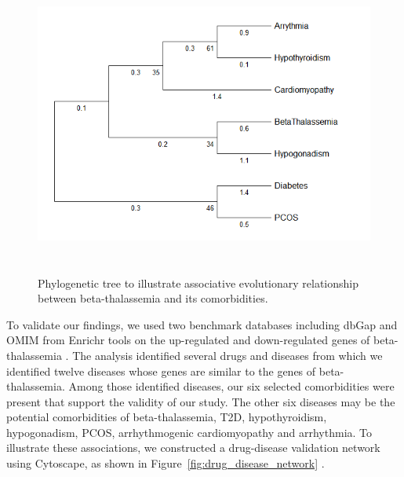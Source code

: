 \begin{figure}[H]
    \centering
    \includegraphics[height=10cm]{./fig/fig4_15.png}
    \centering
    \caption{Phylogenetic tree to illustrate associative evolutionary relationship between beta-thalassemia and its comorbidities.}
    \label{Phylogenetic tree to illustrate associative evolutionary relationship between beta-thalassemia and its comorbidities.}
\end{figure}

To validate our findings, we used two benchmark databases including dbGap and OMIM from Enrichr tools on the up-regulated and down-regulated genes of beta-thalassemia . The analysis identified several drugs and diseases from which we identified twelve diseases whose genes are similar to the genes of beta-thalassemia. Among those identified diseases, our six selected comorbidities were present that support the validity of our study. The other six diseases may be the potential comorbidities of beta-thalassemia, T2D, hypothyroidism, hypogonadism, PCOS, arrhythmogenic cardiomyopathy and arrhythmia. To illustrate these associations, we constructed a drug-disease validation network using Cytoscape, as shown in Figure~\ref{fig:drug_disease_network} .

